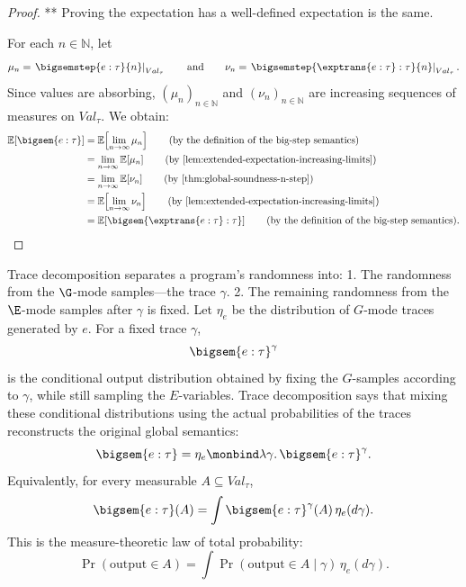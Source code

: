 \begin{proof}
  ** Proving the expectation has a well-defined expectation is the same. 

  For each $n\in\mathbb N$, let
  \[
    \mu_n
    =
    \left.
      \bigsemstep{e:\tau}{n}
    \right|_{Val_\tau}
    \qquad\text{and}\qquad
    \nu_n
    =
    \left.
      \bigsemstep{\exptrans{e:\tau}:\tau}{n}
    \right|_{Val_\tau}.
  \]
  Since values are absorbing, $(\mu_n)_{n\in\mathbb N}$ and
  $(\nu_n)_{n\in\mathbb N}$ are increasing sequences of measures on
  $Val_\tau$. We obtain:
  \begin{align}
    \mathbb E\!\left[\bigsem{e:\tau}\right]
    &=
    \mathbb E\!\left[\lim_{n\to\infty}\mu_n\right]
    \tag{\text{by the definition of the big-step semantics}}
    \\
    &=
    \lim_{n\to\infty}
    \mathbb E\!\left[\mu_n\right]
    \tag{\text{by \Cref{lem:extended-expectation-increasing-limits}}}
    \\
    &=
    \lim_{n\to\infty}
    \mathbb E\!\left[\nu_n\right]
    \tag{\text{by \Cref{thm:global-soundness-n-step}}}
    \\
    &=
    \mathbb E\!\left[\lim_{n\to\infty}\nu_n\right]
    \tag{\text{by \Cref{lem:extended-expectation-increasing-limits}}}
    \\
    &=
    \mathbb E\!\left[
      \bigsem{\exptrans{e:\tau}:\tau}
    \right]
    \tag{\text{by the definition of the big-step semantics}}.
  \end{align}
\end{proof}




Trace decomposition separates a program’s randomness into:
1. The randomness from the \(\G\)-mode samples—the trace \(\gamma\).
2. The remaining randomness from the \(\E\)-mode samples after \(\gamma\) is fixed.
Let \(\eta_e\) be the distribution of \(G\)-mode traces generated by \(e\). For a fixed trace \(\gamma\),
\[
\bigsem{e:\tau}^{\gamma}
\]is the conditional output distribution obtained by fixing the \(G\)-samples according to \(\gamma\), while still sampling the \(E\)-variables.
Trace decomposition says that mixing these conditional distributions using the actual probabilities of the traces reconstructs the original global semantics:
\[
\bigsem{e:\tau}
=
\eta_e
\monbind
\lambda\gamma.\,
\bigsem{e:\tau}^{\gamma}.
\]Equivalently, for every measurable \(A\subseteq Val_\tau\),
\[
\bigsem{e:\tau}(A)
=
\int
  \bigsem{e:\tau}^{\gamma}(A)
\,\eta_e(d\gamma).
\]This is the measure-theoretic law of total probability:
\[
\Pr(\text{output}\in A)
=
\int
\Pr(\text{output}\in A\mid\gamma)
\,\eta_e(d\gamma).
\]


